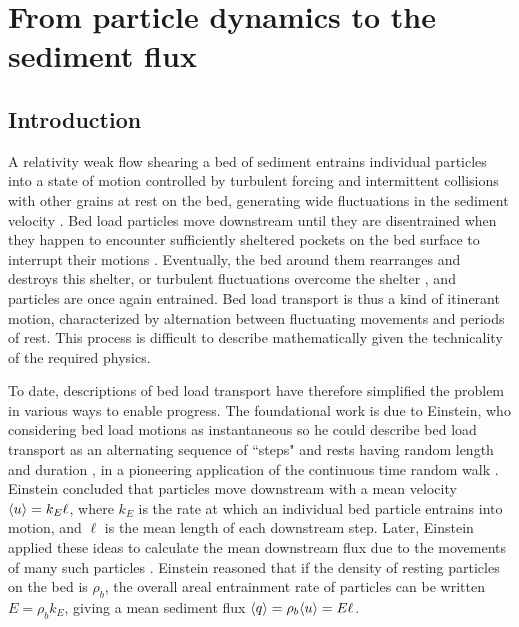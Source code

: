 
\chapter{From particle dynamics to the sediment flux}
\label{ch:flux}
\section{Introduction}

A relativity weak flow shearing a bed of sediment entrains individual particles into a state of motion controlled by turbulent forcing and intermittent collisions with other grains at rest on the bed, generating wide fluctuations in the sediment velocity \citep{Heyman2016,Fathel2015}.
Bed load particles move downstream until they are disentrained when they happen to encounter sufficiently sheltered pockets on the bed surface to interrupt their motions \citep{Charru2004,Gordon1972}.
Eventually, the bed around them rearranges and destroys this shelter, or turbulent fluctuations overcome the shelter \citep{Celik2014,Valyrakis2010}, and particles are once again entrained.
Bed load transport is thus a kind of itinerant motion, characterized by alternation between fluctuating movements and periods of rest.
This process is difficult to describe mathematically given the technicality of the required physics.

To date, descriptions of bed load transport have therefore simplified the problem in various ways to enable progress.
The foundational work is due to Einstein, who considering bed load motions as instantaneous so he could describe bed load transport as an alternating sequence of ``steps" and rests having random length and duration \citep{Einstein1937}, in a pioneering application of the continuous time random walk \citep{Montroll1965}.
Einstein concluded that particles move downstream with a mean velocity $\langle u \rangle = k_E \ell$, where $k_E$ is the rate at which an individual bed particle entrains into motion, and $\ell$ is the mean length of each downstream step.
Later, Einstein applied these ideas to calculate the mean downstream flux due to the movements of many such particles \citep{Einstein1950}. Einstein reasoned that if the density of resting particles on the bed is $\rho_b$, the overall areal entrainment rate of particles can be written $E = \rho_b k_E$, giving a mean sediment flux $\langle q \rangle = \rho_b \langle u \rangle  = E \ell $.

